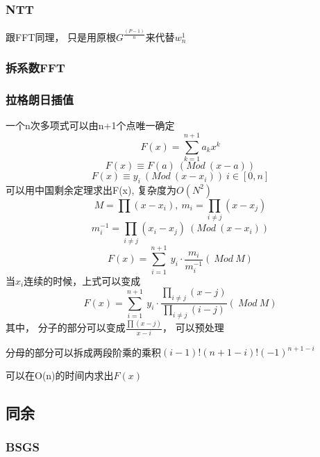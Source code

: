 \documentclass[UTF8]{article}
\newcommand{\cppcode}[1]{
    
}
\begin{document}
\subsubsection{NTT}
跟FFT同理， 只是用原根$G^\frac{(P-1)}{n}$来代替$w_{n}^1$
\cppcode{NTT2.cpp}
\cppcode{NTT.cpp}

\subsubsection{拆系数FFT}
\cppcode{FFT2.cpp}

\subsubsection{拉格朗日插值}
一个n次多项式可以由n+1个点唯一确定
$$F(x) = \sum_{k = 1}^{n+1} a_k x^k$$
$$F(x) \equiv F(a)\ (Mod\ (x-a))$$
$$F(x) \equiv y_i\ (Mod\ (x - x_i)) \ i\in [0, n]$$
可以用中国剩余定理求出F(x), 复杂度为$O(N^2)$
$$M = \prod (x - x_i),\ m_i = \prod_{i\neq j} (x - x_j)$$
$$m_i^{-1} = \prod_{i\neq j} (x_i - x_j)\ (Mod\ (x - x_i))$$
$$F(x) = \sum_{i=1}^{n+1}\ y_i\cdot \frac{m_i}{m_i^{-1}}(\ Mod \ M)$$
当$x_i$连续的时候，上式可以变成
$$F(x) = \sum_{i=1}^{n+1}\ y_i\cdot \frac{\prod_{i\neq j} (x - j)}{\prod_{i\neq j} (i - j)}(\ Mod \ M)$$
其中， 分子的部分可以变成$\frac{\prod (x-j)}{x-i}$， 可以预处理

分母的部分可以拆成两段阶乘的乘积$(i-1)!(n+1-i)!(-1)^{n+1-i}$

可以在O(n)的时间内求出$F(x)$

\cppcode{Lagerange2.cpp}
\cppcode{Lagrange.cpp}

\subsection{同余}
\subsubsection{BSGS}
\end{document}
